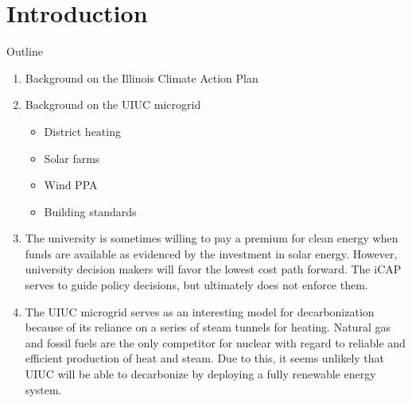 \section{Introduction}

Outline

\begin{enumerate}
  \item Background on the Illinois Climate Action Plan
  \item Background on the UIUC microgrid
  \begin{itemize}
    \item District heating
    \item Solar farms
    \item Wind PPA
    \item Building standards
  \end{itemize}
  \item The university is sometimes willing to pay a premium for clean energy when
  funds are available as evidenced by the investment in solar energy. However,
  university decision makers will favor the lowest cost path forward. The iCAP
  serves to guide policy decisions, but ultimately does not enforce them.
  \item The UIUC microgrid serves as an interesting model for decarbonization
  because of its reliance on a series of steam tunnels for heating. Natural gas
  and fossil fuels are the only competitor for nuclear with regard to reliable
  and efficient production of heat and steam. Due to this, it seems unlikely that
  UIUC will be able to decarbonize by deploying a fully renewable energy system.
\end{enumerate}
